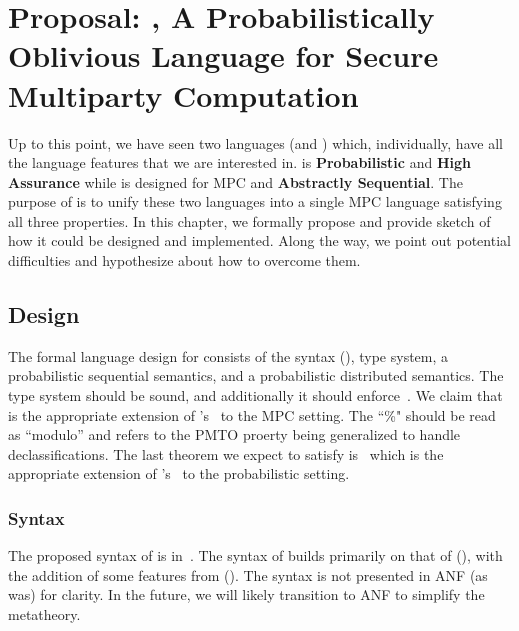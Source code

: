 \chapter{Proposal: \lang, A Probabilistically Oblivious Language for Secure Multiparty Computation}
\label{ch:proposal}

Up to this point, we have seen two languages (\mpc and \obliv) which, individually, have all the language
features that we are interested in. \obliv is \textbf{Probabilistic} and \textbf{High Assurance} while \mpc
is designed for MPC and \textbf{Abstractly Sequential}. The purpose of \lang is to unify these two languages
into a single MPC language satisfying all three properties. In this chapter, we formally propose \lang and
provide sketch of how it could be designed and implemented. Along the way, we point out potential difficulties
and hypothesize about how to overcome them.

\section{Design}
\label{sec:proposal-design}

The formal language design for \lang consists of the syntax (), type system,
a probabilistic sequential semantics, and a probabilistic distributed semantics.
The type system should be sound, and additionally it should enforce~. We claim that~
is the appropriate extension of \obliv's~ to the MPC setting. The ``\%" should be read as ``modulo'' and refers
to the PMTO proerty being generalized to handle declassifications. The last theorem we expect \lang to satisfy is~
which is the appropriate extension of \mpc's~ to the probabilistic setting.


\subsection{Syntax}
\label{subsec:proposal-design-syntax}

The proposed syntax of \lang is in~. The syntax of \lang builds primarily
on that of \mpc (), with the addition of some features from \obliv ().
The syntax is not presented in ANF (as \mpc was) for clarity. In the future, we will likely transition
to ANF to simplify the metatheory.

